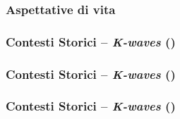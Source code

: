 \begin{frame}
		\frametitle{Aspettative di vita}

    \begin{center}
    \end{center}

\end{frame}

\setcounter{ms}{0}
\begin{frame}
    \frametitle{Contesti Storici -- \emph{K-waves} ()}

    \begin{center}
    \end{center}

\end{frame}

\begin{frame}
    \frametitle{Contesti Storici -- \emph{K-waves} ()}

    \begin{center}
    \end{center}

\end{frame}

\begin{frame}
    \frametitle{Contesti Storici -- \emph{K-waves} ()}

    \begin{center}
    \end{center}

\end{frame}
